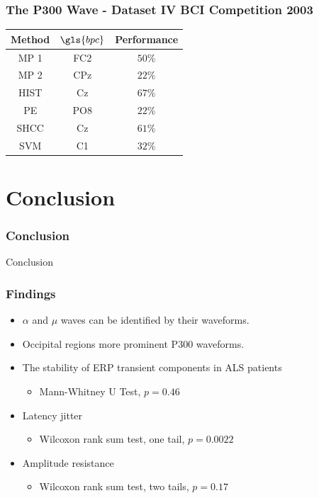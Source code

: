 \documentclass[aspectratio=169]{beamer}
\newcommand\Fontre{\fontsize{16}{16.2}\selectfont}
\begin{document}
\begin{frame}
\frametitle{The P300 Wave - Dataset IV BCI Competition 2003 }    
\begin{table}[h!]
\centering
\begin{tabular}{ccc}
\toprule
\textbf{Method}	& \textbf{$\gls{bpc}$} &  \textbf{Performance} \\
\midrule
MP 1 & FC2  & $50\%$ \\
MP 2 & CPz & $22\%$ \\
HIST  & Cz & $67\%$ \\
PE     & PO8 & $22\%$ \\
SHCC & Cz & $61\%$ \\
SVM     & C1  & $32\%$ \\
\bottomrule
\end{tabular}
\label{tab:bcicompetitionresults}
\end{table}
\end{frame} 
    
    \section{Conclusion}
\begin{frame}
\frametitle{Conclusion}
\begin{center}
\LARGE Conclusion
\end{center}
\end{frame}

\begin{frame}
\frametitle{Findings}
\begin{center}
\begin{itemize}
\item \Fontre $\alpha$ and $\mu$ waves can be identified by their waveforms.
\item \Fontre Occipital regions more prominent P300 waveforms.
\item \Fontre The stability of ERP transient components in ALS patients 
\begin{itemize}
\item Mann-Whitney U Test, $p=0.46$
\end{itemize}
\item \Fontre Latency jitter 
\begin{itemize}
\item Wilcoxon rank sum test, one tail, $p=0.0022$
\end{itemize}
\item \Fontre Amplitude resistance 
\begin{itemize}
\item Wilcoxon rank sum test, two tails, $p=0.17$
\end{itemize}
\end{itemize}
\end{center}
\end{frame}
\end{document}
